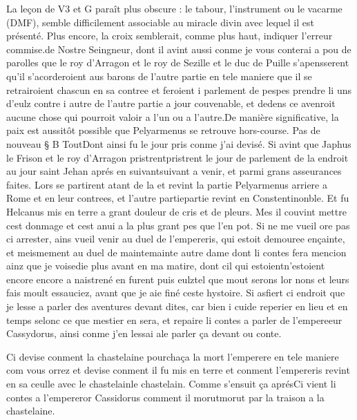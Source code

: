 \documentclass{article}
\begin{document}
\begin{pages}
   La leçon de V3 et G paraît plus obscure : le tabour, l'instrument ou le vacarme (DMF), semble difficilement
   associable au miracle divin avec lequel il est présenté. Plus encore, la croix semblerait, comme plus haut, indiquer l'erreur commise.de 
   Nostre Seingneur, dont il avint aussi conme je vous conterai a pou de parolles que 
   le roy d’Arragon et 
   le roy de Sezille et 
   le duc de Puille s’apensserent 
   qu’il s’acorderoient aus barons de l’autre partie en tele maniere que il se retrairoient chascun 
      en sa contree et feroient i parlement de pespes prendre 
      li uns d’eulz contre i autre de l’autre partie a jour couvenable, 
   et dedens ce avenroit aucune chose qui pourroit valoir a l’un ou a l’autre.De manière significative, 
   la paix est aussitôt possible que Pelyarmenus se retrouve hors-course. \pend
\pstart Pas de nouveau § B
   ToutDont ainsi fu le jour pris 
   conme j’ai devisé. Si avint que 
   Japhus le Frison 
   et le roy d’Arragon 
   pristrentpristrent le jour de parlement de la endroit au jour saint Jehan 
   aprés en suivantsuivant a venir, et parmi grans asseurances faites. 
   Lors se partirent atant de la et revint la partie Pelyarmenus 
   arriere a Rome et en leur contrees, 
   et l’autre partiepartie revint en Constentinonble. Et fu Helcanus 
   mis en terre a grant douleur de cris et de pleurs. Mes il couvint mettre cest donmage et cest anui a la plus grant pes que l’en pot. 
   Si ne me vueil ore pas ci arrester, ains vueil venir 
   au duel de l’empereris, qui estoit demouree ençainte, et meismement au duel de 
   maintemainte autre dame dont li contes fera mencion ainz 
      que je voisedie plus avant en ma matire, dont cil qui 
   estoientn'estoient encore 
   encore a naistrené en furent puis 
   eulztel que mout serons lor nons et leurs fais moult essauciez, 
   avant que je aie finé ceste hystoire. Si asfiert ci endroit que je lesse a parler des aventures devant dites, 
      car bien i cuide reperier en lieu et en temps selonc ce que mestier en sera, et repaire li contes a 
      parler de l’empereeur 
   Cassydorus, ainsi conme j’en lessai 
      ale parler ça devant ou conte. \pend
         
         
Ci devise conment la chastelaine 
   pourchaça la mort l’emperere en tele maniere com vous orrez 
   et devise conment il fu mis en terre et conment l’empereris revint en sa ceulle avec 
   le chastelainle chastelain. 
      Comme s'ensuit ça aprésCi vient li contes a l'empereror Cassidorus
         comment il morutmorut par la traison a la chastelaine.
            

\end{pages}
\end{document}
